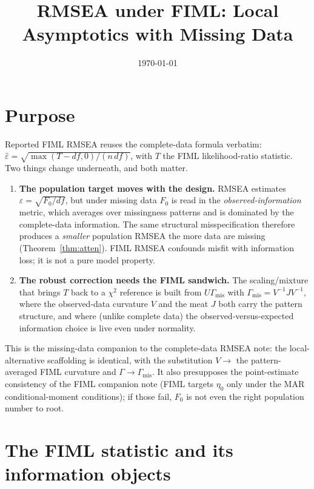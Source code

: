 \documentclass[11pt]{article}
\title{RMSEA under FIML: Local Asymptotics with Missing Data}
\author{}
\date{\today}
\newcommand{\Gmis}{\Gamma_{\mathrm{mis}}}
\newcommand{\rmsea}{\widehat{\varepsilon}}
\theoremstyle{plain}
\theoremstyle{remark}
\begin{document}
\maketitle

\section*{Purpose}

Reported FIML RMSEA reuses the complete-data formula verbatim:
$\rmsea=\sqrt{\max(T-df,0)/(n\,df)}$, with $T$ the FIML likelihood-ratio
statistic. Two things change underneath, and both matter.

\begin{enumerate}
  \item \textbf{The population target moves with the design.} RMSEA estimates
        $\varepsilon=\sqrt{F_0/df}$, but under missing data $F_0$ is read in the
        \emph{observed-information} metric, which averages over missingness
        patterns and is dominated by the complete-data information. The same
        structural misspecification therefore produces a \emph{smaller}
        population RMSEA the more data are missing (Theorem~\ref{thm:atten}).
        FIML RMSEA confounds misfit with information loss; it is not a pure model
        property.
  \item \textbf{The robust correction needs the FIML sandwich.} The
        scaling/mixture that brings $T$ back to a $\chi^2$ reference is built
        from $U\Gmis$ with $\Gmis=V^{-1}JV^{-1}$, where the observed-data
        curvature $V$ and the meat $J$ both carry the pattern structure, and
        where (unlike complete data) the observed-versus-expected information
        choice is live even under normality.
\end{enumerate}

This is the missing-data companion to the complete-data RMSEA note: the
local-alternative scaffolding is identical, with the substitution $V\to$ the
pattern-averaged FIML curvature and $\Gamma\to\Gmis$. It also presupposes the
point-estimate consistency of the FIML companion note (FIML targets $\eta_0$
only under the MAR conditional-moment conditions); if those fail, $F_0$ is not
even the right population number to root.

\section{The FIML statistic and its information objects}
\end{document}

